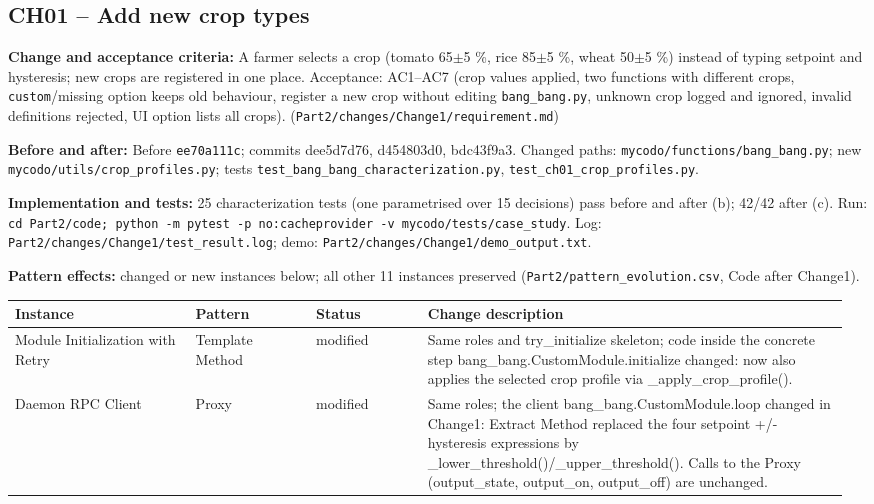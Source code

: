 \documentclass[11pt,a4paper]{article}
\newcommand{\field}[2]{\textbf{#1:} #2\par}
\begin{document}
\subsection*{CH01 -- Add new crop types}
\field{Change and acceptance criteria}{A farmer selects a crop (tomato 65$\pm$5 \%, rice 85$\pm$5 \%, wheat 50$\pm$5 \%) instead of typing setpoint and hysteresis; new crops are registered in one place. Acceptance: AC1--AC7 (crop values applied, two functions with different crops, \texttt{custom}/missing option keeps old behaviour, register a new crop without editing \texttt{bang\_\allowbreak{}bang.\allowbreak{}py}, unknown crop logged and ignored, invalid definitions rejected, UI option lists all crops). (\texttt{Part2/\allowbreak{}changes/\allowbreak{}Change1/\allowbreak{}requirement.\allowbreak{}md})}
\field{Before and after}{Before \texttt{ee70a111c}; commits dee5d7d76, d454803d0, bdc43f9a3. Changed paths: \texttt{mycodo/\allowbreak{}functions/\allowbreak{}bang\_\allowbreak{}bang.\allowbreak{}py}; new \texttt{mycodo/\allowbreak{}utils/\allowbreak{}crop\_\allowbreak{}profiles.\allowbreak{}py}; tests \texttt{test\_\allowbreak{}bang\_\allowbreak{}bang\_\allowbreak{}characterization.\allowbreak{}py}, \texttt{test\_\allowbreak{}ch01\_\allowbreak{}crop\_\allowbreak{}profiles.\allowbreak{}py}.}
\field{Implementation and tests}{25 characterization tests (one parametrised over 15 decisions) pass before and after (b); 42/42 after (c). Run: \texttt{cd Part2/\allowbreak{}code; python -m pytest -p no:cacheprovider -v mycodo/\allowbreak{}tests/\allowbreak{}case\_\allowbreak{}study}. Log: \texttt{Part2/\allowbreak{}changes/\allowbreak{}Change1/\allowbreak{}test\_\allowbreak{}result.\allowbreak{}log}; demo: \texttt{Part2/\allowbreak{}changes/\allowbreak{}Change1/\allowbreak{}demo\_\allowbreak{}output.\allowbreak{}txt}.}
\field{Pattern effects}{changed or new instances below; all other 11 instances preserved (\texttt{Part2/\allowbreak{}pattern\_\allowbreak{}evolution.\allowbreak{}csv}, Code after Change1).}
{\small\setlength{\tabcolsep}{3pt}
\begin{longtable}{@{}P{0.21\linewidth}P{0.14\linewidth}P{0.13\linewidth}P{0.49\linewidth}@{}}\toprule
\textbf{Instance} & \textbf{Pattern} & \textbf{Status} & \textbf{Change description} \\ \midrule\endhead
Module Initialization with Retry & Template Method & modified & Same roles and try\_initialize skeleton; code inside the concrete step bang\_bang.CustomModule.initialize changed: now also applies the selected crop profile via \_apply\_crop\_profile(). \\
Daemon RPC Client & Proxy & modified & Same roles; the client bang\_bang.CustomModule.loop changed in Change1: Extract Method replaced the four setpoint +/- hysteresis expressions by \_lower\_threshold()/\_upper\_threshold(). Calls to the Proxy (output\_state, output\_on, output\_off) are unchanged. \\
\bottomrule\end{longtable}}
\end{document}
